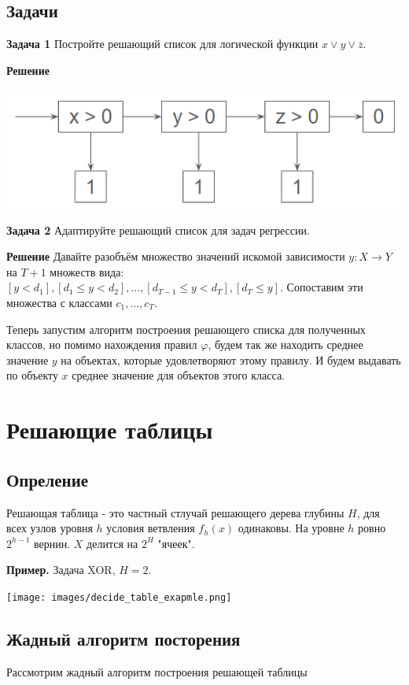 \subsection{Задачи}

\textbf{Задача 1}
Постройте решающий список для логической функции $x \vee y \vee \overline{z}.$

\textbf{Решение}

\includegraphics[scale = 0.5]{images/decide_list_task1_sol.png}

\textbf{Задача 2}
Адаптируйте решающий список для задач регрессии.

\textbf{Решение}
Давайте разобъём множество значений искомой зависимости $y: X \rightarrow{} Y$ на $T + 1$ множеств вида:
$[y < d_1], [d_1 \leq y < d_2], ..., [d_{T-1} \leq y < d_T], [d_T \leq y].$ 
Сопоставим эти множества с классами $c_1, \dots, c_T$.

Теперь запустим алгоритм построения решающего списка для полученных классов, 
но помимо нахождения правил $\varphi$, будем так же находить среднее значение $y$ на объектах, которые удовлетворяют этому правилу.
И будем выдавать по объекту $x$ среднее значение для объектов этого класса.

\section {Решающие таблицы}
\subsection{Опреление}

Решающая таблица - это частный стлучай решающего дерева глубины $H$, для всех узлов уровня $h$ условия ветвления $f_h(x)$ одинаковы. На уровне $h$ ровно $2^{h-1}$ вернин. $X$ делится на $2^H$ "ячеек".

\textbf{Пример.} Задача XOR, $H = 2$.

    \texttt{[image: images/decide\_table\_exapmle.png]}

\subsection{Жадный алгоритм посторения}
Рассмотрим жадный алгоритм построения решающей таблицы

